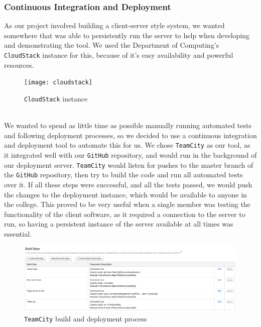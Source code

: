 \documentclass{article}
\begin{document}
\subsubsection{Continuous Integration and Deployment}
As our project involved building a client-server style system, we wanted somewhere that was able to persistently run the server to help when developing and demonstrating the tool. We used the Department of Computing's \texttt{CloudStack} \cite{cloudstack} instance for this, because of it's easy availability and powerful resources. 
\begin{figure}[h]
  \centering
  \texttt{[image: cloudstack]}
  \caption{\texttt{CloudStack} \cite{cloudstack} instance}
  \label{fig:cloudstack}
\end{figure}
\\
We wanted to spend as little time as possible manually running automated tests and following deployment processes, so we decided to use a continuous integration and deployment tool to automate this for us. We chose \texttt{TeamCity} \cite{teamcity} as our tool, as it integrated well with our \texttt{GitHub} repository, and would run in the background of our deployment server. \texttt{TeamCity} \cite{teamcity} would listen for pushes to the master branch of the \texttt{GitHub} repository, then try to build the code and run all automated tests over it. If all these steps were successful, and all the tests passed, we would push the changes to the deployment instance, which would be available to anyone in the college. This proved to be very useful when a single member was testing the functionality of the client software, as it required a connection to the server to run, so having a persistent instance of the server available at all times was essential. 
\begin{figure}[h]
  \centering
  \includegraphics[scale=0.35]{buildserver}
  \caption{\texttt{TeamCity} \cite{teamcity} build and deployment process}
  \label{fig:buildserver}
\end{figure}
\\ 
\end{document}
